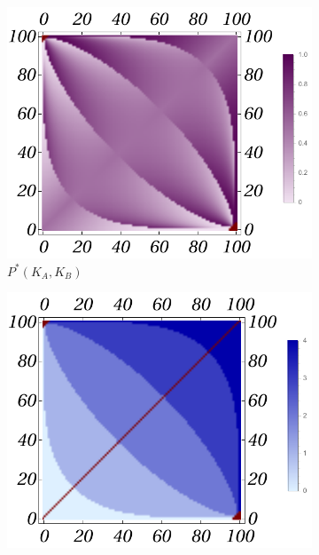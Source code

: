 \documentclass{beamer}
\theoremstyle{definition}
\begin{document}
\begin{frame}[shrink=40]

\begin{figure}[H]
    \centering
    \begin{subfigure}[b]{0.3\textwidth}
        \includegraphics[width=\textwidth]{img/P_Plot_4_100.pdf}
        \caption{\small \centering $P^*(K_A,K_B)$}
        \label{fig:Game4__100_P}
    \end{subfigure}
    \hfill %
    \begin{subfigure}[b]{0.3\textwidth}
        \includegraphics[width=\textwidth]{img/k_Plot_4_100.pdf}

\end{subfigure}
\end{figure}
\end{frame}
\end{document}
